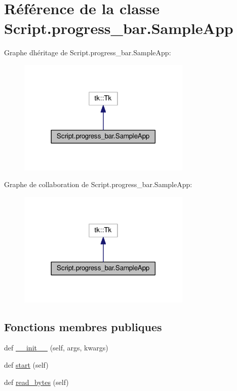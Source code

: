 \hypertarget{classScript_1_1progress__bar_1_1SampleApp}{}\section{Référence de la classe Script.\+progress\+\_\+bar.\+Sample\+App}
\label{classScript_1_1progress__bar_1_1SampleApp}


Graphe d\textquotesingle{}héritage de Script.\+progress\+\_\+bar.\+Sample\+App\+:\nopagebreak
\begin{figure}[H]
\begin{center}
\leavevmode
\includegraphics[width=234pt]{classScript_1_1progress__bar_1_1SampleApp__inherit__graph}
\end{center}
\end{figure}


Graphe de collaboration de Script.\+progress\+\_\+bar.\+Sample\+App\+:\nopagebreak
\begin{figure}[H]
\begin{center}
\leavevmode
\includegraphics[width=234pt]{classScript_1_1progress__bar_1_1SampleApp__coll__graph}
\end{center}
\end{figure}
\subsection*{Fonctions membres publiques}
\begin{DoxyCompactItemize}
\item 
def \hyperlink{classScript_1_1progress__bar_1_1SampleApp_ac74edf5e4c6a6835b34e3df414954187}{\+\_\+\+\_\+init\+\_\+\+\_\+} (self, args, kwargs)
\item 
def \hyperlink{classScript_1_1progress__bar_1_1SampleApp_a9c3207958e5b061a0c5c43d986ccb17b}{start} (self)
\item 
def \hyperlink{classScript_1_1progress__bar_1_1SampleApp_ac84a187555b70009960d8205c352a6c7}{read\+\_\+bytes} (self)
\end{DoxyCompactItemize}
